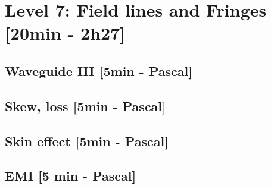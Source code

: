 
\section{Level 7: Field lines and Fringes [20min - 2h27]}

\subsection{Waveguide III [5min - Pascal]}

\subsection{Skew, loss [5min - Pascal]}
\subsection{Skin effect [5min - Pascal]}
\subsection{EMI [5 min - Pascal]}
